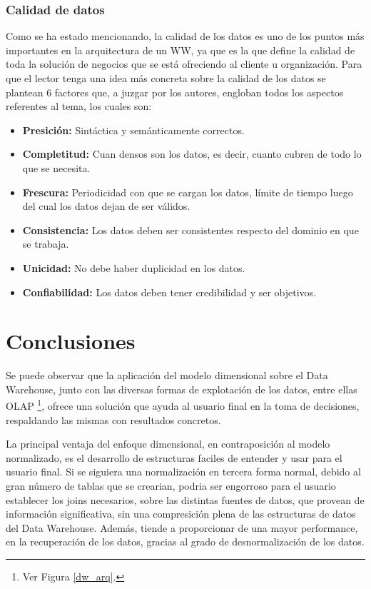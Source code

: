 \documentclass[a4paper,11pt]{article}
\begin{document}
    
    \subsubsection{Calidad de datos}
    
    Como se ha estado mencionando, la calidad de los datos es uno de los puntos más importantes en la arquitectura de un WW, ya que es la que define la calidad
    de toda la solución de negocios que se está ofreciendo al cliente u organización. Para que el lector tenga una idea más concreta sobre la calidad de los
    datos se plantean 6 factores que, a juzgar por los autores, engloban todos los aspectos referentes al tema, los cuales son:
    
    \begin{itemize}
      \item \textbf{Presición:} Sintáctica y semánticamente correctos.
      \item \textbf{Completitud:} Cuan densos son los datos, es decir, cuanto cubren de todo lo que se necesita.
      \item \textbf{Frescura:} Periodicidad con que se cargan los datos, límite de tiempo luego del cual los datos dejan de ser válidos.
      \item \textbf{Consistencia:} Los datos deben ser consistentes respecto del dominio en que se trabaja.
      \item \textbf{Unicidad:} No debe haber duplicidad en los datos.
      \item \textbf{Confiabilidad:} Los datos deben tener credibilidad y ser objetivos.
    \end{itemize}
  
  

  \section{Conclusiones}
  
  Se puede observar que la aplicación del modelo dimensional sobre el Data Warehouse, junto con las diversas formas de explotación de los datos, entre ellas
  OLAP \footnote{Ver Figura \ref{dw_arq}.}, ofrece una solución que ayuda al usuario final en la toma de decisiones, respaldando las mismas con resultados concretos.
  
  La principal ventaja del enfoque dimensional, en contraposición al modelo normalizado, es el desarrollo de estructuras faciles de entender y usar para el
  usuario final. Si se siguiera una normalización en tercera forma normal, debido al gran número de tablas que se crearian, podria ser engorroso para el
  usuario establecer los joins necesarios, sobre las distintas fuentes de datos, que provean de información significativa, sin una compresición plena
  de las estructuras de datos del Data Warehouse.
  Además, tiende a proporcionar de una mayor performance, en la recuperación de los datos, gracias al grado de desnormalización de los datos.
  
\end{document}

